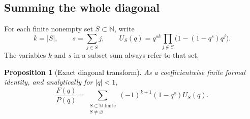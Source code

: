 \documentclass[11pt,letterpaper]{article}
\numberwithin{equation}{section}
\newtheorem{proposition}[theorem]{Proposition}
\theoremstyle{definition}\newtheorem{definition}[theorem]{Definition}
\theoremstyle{remark}\newtheorem{remark}[theorem]{Remark}
\newcommand{\N}{\mathbb N}
\begin{document}
\subsection{Summing the whole diagonal}
For each finite nonempty set $S\subset\N$, write
\begin{equation}\label{dmm:eq:sets}
k=|S|,\qquad s=\sum_{j\in S}j,\qquad
U_S(q)=q^{sk}\prod_{j\notin S}\bigl(1-(1-q^s)q^j\bigr).
\end{equation}
The variables $k$ and $s$ in a subset sum always refer to that set.

\begin{proposition}[Exact diagonal transform]\label{dmm:prop:transform}
As a coefficientwise finite formal identity, and analytically for $|q|<1$,
\begin{equation}\label{dmm:eq:transform}
\frac{F(q)}{P(q)}=
\sum_{\substack{S\subset\N\text{ finite}\\S\ne\varnothing}}
(-1)^{k+1}(1-q^s)U_S(q).
\end{equation}
\end{proposition}
\end{document}
